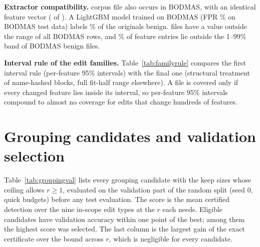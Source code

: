 \documentclass[preprint,12pt,authoryear]{elsarticle}
\begin{document}
\textbf{Extractor compatibility.} \XcNMatches{} corpus file also occurs in BODMAS, with an identical feature vector (\XcNMatchesIdentical{} of \XcNMatches). A LightGBM model trained on BODMAS (FPR \XcBodmasFpr\% on BODMAS test data) labels \XcBenignRate\% of the originals benign. \XcNFilesOutsideRange{} files have a value outside the range of all BODMAS rows, and \XcOutsideBandPct\% of feature entries lie outside the 1--99\% band of BODMAS benign files.

\textbf{Interval rule of the edit families.} Table~\ref{tab:familyrule} compares the first interval rule (per-feature 95\% intervals) with the final one (structural treatment of name-hashed blocks, full fit-half range elsewhere). A file is covered only if every changed feature lies inside its interval, so per-feature 95\% intervals compound to almost no coverage for edits that change hundreds of features.

\begin{table}[!htbp]
\centering\small
\caption{Edit map per architecture: files, groups changed (median and maximum) and median $\epsilon$ needed.}\label{tab:editmaparch}
\resizebox{\textwidth}{!}{}
\end{table}

\begin{table}[!htbp]
\centering\small
\caption{Edit-family sets: support size and eval-half coverage (\%) of $T_f(t)$ under the first (95\% intervals) and the final interval rule.}\label{tab:familyrule}
\resizebox{\textwidth}{!}{}
\end{table}

\FloatBarrier
\section{Grouping candidates and validation selection}\label{app:grouping}
Table~\ref{tab:groupingval} lists every grouping candidate with the keep sizes whose ceiling allows $r\ge1$, evaluated on the validation part of the random split (seed 0, quick budgets) before any test evaluation. The score is the mean certified detection over the nine in-scope edit types at the $r$ each needs. Eligible candidates have validation accuracy within one point of the best; among them the highest score was selected. The last column is the largest gain of the exact certificate over the bound across $r$, which is negligible for every candidate.

\begin{table}[!htbp]
\centering\small
\caption{Grouping candidates on the validation split (\%): groups, attackable groups, views, largest certifiable $r$, accuracy, FPR, score, number of edit types certified, eligibility, and the exact-minus-bound gain (points).}\label{tab:groupingval}
\resizebox{\textwidth}{!}{}
\end{table}
\end{document}

